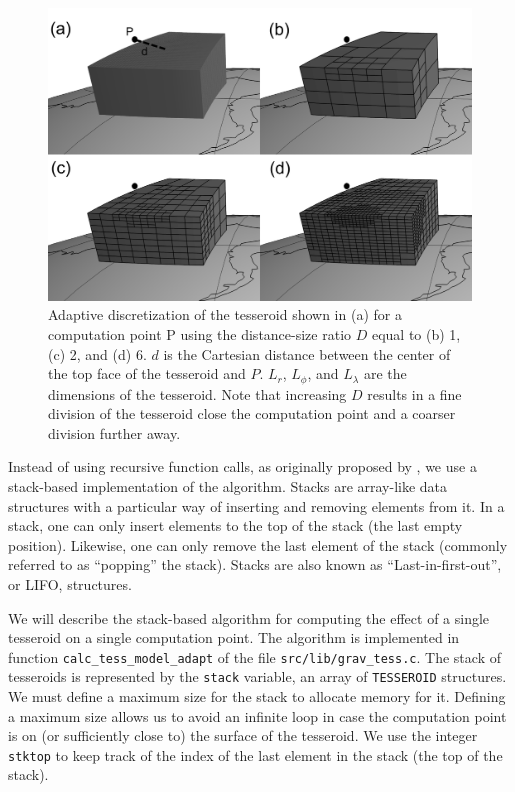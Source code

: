 \documentclass[paper,twocolumn]{geophysics}
\begin{document}
\begin{figure}
    \centering
    \includegraphics{figs/tesseroid-split}
    \caption{
        Adaptive discretization
        of the tesseroid shown in (a)
        for a computation point P
        using the distance-size ratio $D$ equal to
        (b) 1, (c) 2, and (d) 6.
        $d$ is the Cartesian distance between
        the center of the top face of the tesseroid
        and $P$.
        $L_r$, $L_\phi$, and $L_\lambda$ are the dimensions of the tesseroid.
        Note that increasing $D$
        results in a fine division of the tesseroid
        close the computation point
        and a coarser division further away.
    }
    \label{fig:division}
\end{figure}

Instead of using recursive function calls,
as originally proposed by \citet{Li2011},
we use a stack-based implementation of the algorithm.
Stacks are array-like data structures
with a particular way of inserting and removing elements from it.
In a stack,
one can only insert elements to the top of the stack
(the last empty position).
Likewise,
one can only remove the last element of the stack
(commonly referred to as ``popping'' the stack).
Stacks are also known as ``Last-in-first-out'', or LIFO, structures.

We will describe the stack-based algorithm
for computing the effect of a single tesseroid
on a single computation point.
The algorithm is implemented in function \texttt{calc\_tess\_model\_adapt}
of the file \texttt{src/lib/grav\_tess.c}.
The stack of tesseroids is represented by
the \texttt{stack} variable,
an array of \texttt{TESSEROID} structures.
We must define a maximum size for the stack to allocate memory for it.
Defining a maximum size allows us to
avoid an infinite loop
in case the computation point is on
(or sufficiently close to) the surface of the tesseroid.
We use the integer \texttt{stktop}
to keep track of the index of
the last element in the stack (the top of the stack).
\end{document}
